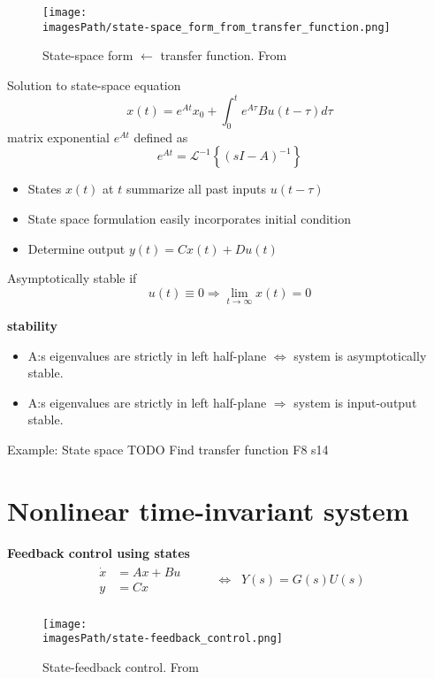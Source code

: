 \begin{figure}[!h]
    \centering
    \texttt{[image: \\imagesPath/state-space\_form\_from\_transfer\_function.png]}
    \caption{State-space form $\leftarrow$ transfer function. From \cite{}}
\end{figure}

Solution to state-space equation
\begin{equation*}
    x(t) = e^{At}x_0 + \int_{0}^{t} e^{A\tau} Bu(t-\tau)d\tau
\end{equation*}
matrix exponential $e^{At}$ defined as
\begin{equation*}
    e^{At} = \mathcal{L}^{-1}\left\{ (sI-A)^{-1} \right\}
\end{equation*}

\begin{itemize}
    \item States $x(t)$ at $t$ summarize all past inputs $u(t-\tau)$
    \item State space formulation easily incorporates initial condition
    \item Determine output $y(t) = Cx(t) + Du(t)$
\end{itemize}

Asymptotically stable if 
\begin{equation*}
    u(t) \equiv 0 \Rightarrow \lim_{t\to\infty} x(t) = 0
\end{equation*}

\textbf{stability}
\begin{itemize}
    \item A:s eigenvalues are strictly in left half-plane $\Leftrightarrow$ system is asymptotically stable.
    \item A:s eigenvalues are strictly in left half-plane $\Rightarrow$ system is input-output stable.
\end{itemize}

\begin{exampleblock}{Example: State space}
   TODO  Find transfer function F8 s14
\end{exampleblock}

\section{Nonlinear time-invariant system}
\textbf{Feedback control using states}
\begin{align*}
    \begin{aligned} 
        \dot{x} &= Ax + Bu \\
        y &= Cx 
    \end{aligned}& && \Leftrightarrow \;\; Y(s) = G(s)U(s) \\
\end{align*}
\begin{figure}[!h]
    \centering
    \texttt{[image: \\imagesPath/state-feedback\_control.png]}
    \caption{State-feedback control. From \cite{}}
\end{figure}


